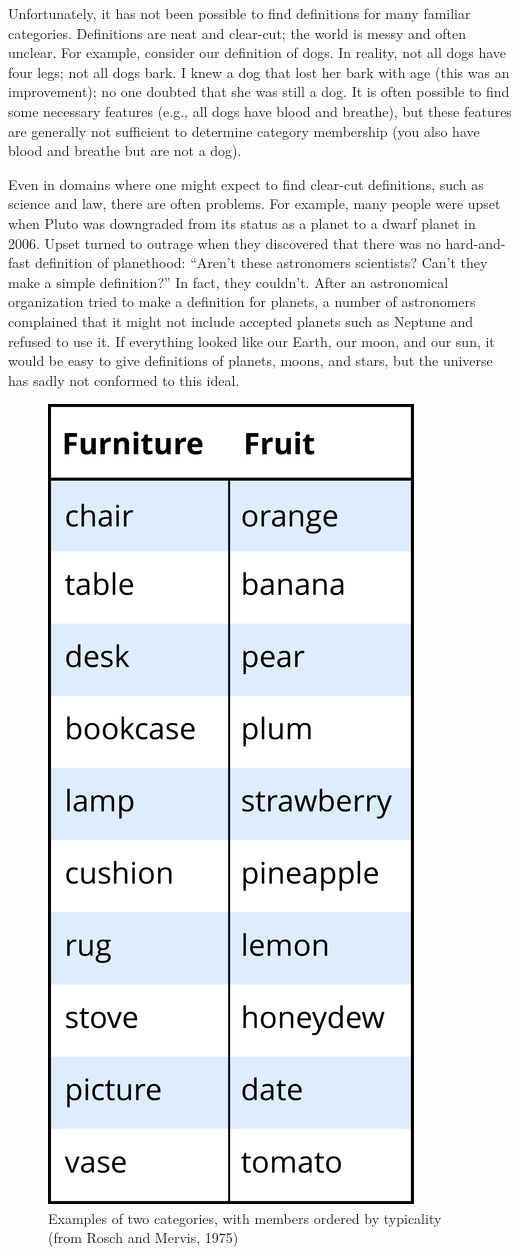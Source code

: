 \documentclass[
]{krantz}
\begin{document}
Unfortunately, it has not been possible to find definitions for many familiar categories. Definitions are neat and clear-cut; the world is messy and often unclear. For example, consider our definition of dogs. In reality, not all dogs have four legs; not all dogs bark. I knew a dog that lost her bark with age (this was an improvement); no one doubted that she was still a dog. It is often possible to find some necessary features (e.g., all dogs have blood and breathe), but these features are generally not sufficient to determine category membership (you also have blood and breathe but are not a dog).

Even in domains where one might expect to find clear-cut definitions, such as science and law, there are often problems. For example, many people were upset when Pluto was downgraded from its status as a planet to a dwarf planet in 2006. Upset turned to outrage when they discovered that there was no hard-and-fast definition of planethood: ``Aren't these astronomers scientists? Can't they make a simple definition?'' In fact, they couldn't. After an astronomical organization tried to make a definition for planets, a number of astronomers complained that it might not include accepted planets such as Neptune and refused to use it. If everything looked like our Earth, our moon, and our sun, it would be easy to give definitions of planets, moons, and stars, but the universe has sadly not conformed to this ideal.

\begin{figure}

{\centering \includegraphics[width=0.3\linewidth]{images/ch7/table1} 

}

\caption{Examples of two categories, with members ordered by typicality (from Rosch and Mervis, 1975)}\label{fig:table1}
\end{figure}
\end{document}
